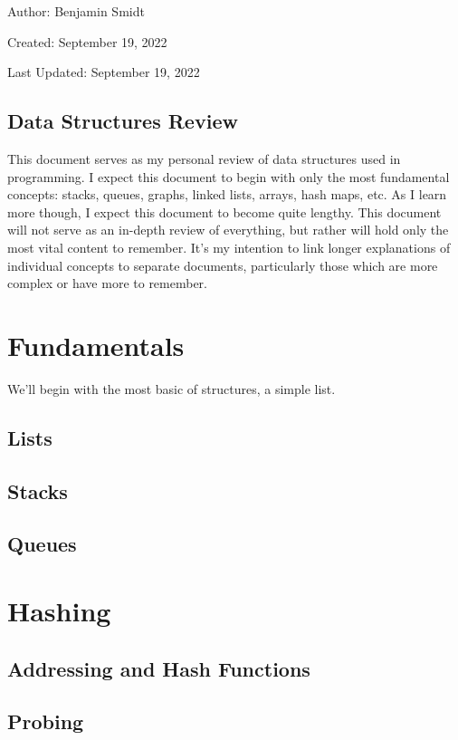 \documentclass[12pt]{article}
\begin{document}
\noindent Author: Benjamin Smidt

\noindent Created: September 19, 2022

\noindent Last Updated: September 19, 2022
\begin{center}
\section*{Data Structures Review}
\end{center}

\noindent This document serves as my personal review of data structures used in programming. 
I expect this document to begin with only the most fundamental concepts: stacks, queues, graphs, 
linked lists, arrays, hash maps, etc. As I learn more though, I expect this document to become quite lengthy. This 
document will not serve as an in-depth review of everything, but rather will hold only the most vital content
to remember. It's my intention to link longer explanations of individual concepts to separate documents, 
particularly those which are more complex or have more to remember. 

\tableofcontents{}

\section{Fundamentals}
We'll begin with the most basic of structures, a simple list. 

\subsection{Lists}
\subsection{Stacks}
\subsection{Queues}

\section{Hashing}
\subsection{Addressing and Hash Functions}
\subsection{Probing}
\end{document}
